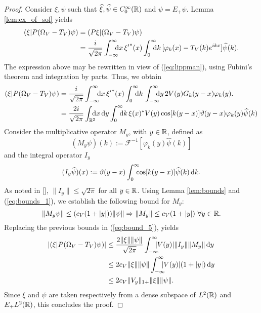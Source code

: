 \begin{proof}
	Consider $\xi,\psi$ such that $\widehat{\xi},\widehat{\psi}\in C_0^\infty({\mathbb R})$ and $\psi=E_+\psi$. Lemma \ref{lem:ex_of_sol} yields
	\begin{equation}
	\begin{aligned}
	(\xi|P(\Omega_V-T_V)\psi)&=(P\xi|(\Omega_V-T_V)\psi)\\ &=\frac{i}{\sqrt{2\pi}}\int_{-\infty}^{\infty}\nspace\!\dd x\, {\xi'}^*(x)\int_{0}^{\infty}\nspace\! \dd k\, [\varphi_k(x)-T_V(k)e^{ikx}]\hat{\psi}(k).
	\end{aligned}
	\end{equation}
	The expression above may be rewritten in view of (\ref{eq:lippman}), using Fubini's theorem and integration by parts. Thus, we obtain
	\begin{equation}
	\label{eq:bound_5}
	\begin{aligned}
	(\xi|P(\Omega_V-T_V)\psi)&=\frac{i}{\sqrt{2\pi}}\int_{-\infty}^{\infty}\nspace \dd x\, {\xi'}^*(x)\int_{0}^{\infty}\nspace\!\dd k\,\int_{-\infty}^{\infty}\nspace\! \dd y\, 2V(y)G_k(y-x)\varphi_k(y).\\
	& = \frac{2i}{\sqrt{2\pi}}\int_{\mR^2}\nspace\!\dd x\,\dd y\int_{0}^{\infty}\nspace\!\dd k\, \xi(x)^*V(y)\cos[k(y-x)]\theta(y-x)\varphi_k(y)\hat{\psi}(k)
	\end{aligned}
	\end{equation}
	Consider the multiplicative operator $M_y$, with $y\in{\mathbb R}$, defined as
	\begin{equation}
		(M_y\psi)(k):=\mathcal{F}^{-1}[\varphi_k(y)\hat{\psi}(k)]
	\end{equation}
	and the integral operator $I_y$
	\begin{equation}
		(I_y\widehat{\psi})(x):=\vartheta(y-x)\int_{0}^{\infty}\!\!\!\!\cos[k(y-x)]\widehat{\psi}(k)\, \mathrm d k.
	\end{equation}
	As noted in [\citealp[Prop. 2]{gand}], %
	 $\|I_y\|\le\sqrt{2\pi}$ for all $y\in{\mathbb R}$. Using Lemma \ref{lem:bounds} and (\ref{eq:bounds_1}), we establish the following bound for $M_y$:
	\begin{equation}
		\|M_y\psi\|\le (c_V(1+|y|))\|\psi\|\Rightarrow \|M_y\|\le c_V(1+|y|)\ \forall y\in{\mathbb R}.
	\end{equation}
	Replacing the previous bounds in (\ref{eq:bound_5}), yields
	\begin{equation}
	\begin{aligned}
	|(\xi|P(\Omega_V-T_V)\psi)|&\le \frac{2\|\xi\|\|\psi\|}{\sqrt{2\pi}}\int_{-\infty}^{\infty}\nspace\!|V(y)|\|I_y\|\|M_y\|\,\dd y\\
	&\le 2c_V\|\xi\|\|\psi\|\int_{-\infty}^{\infty}\nspace\!|V(y)|(1+|y|)\,\dd y\\ &\le 2c_V\|V_y\|_{1+}\|\xi\|\|\psi\|.
	\end{aligned}
	\end{equation}
	Since $\xi$ and $\psi$ are taken respectively from a dense subspace of $L^2({\mathbb R})$ and $E_+L^2({\mathbb R})$, this concludes the proof.
\end{proof}

